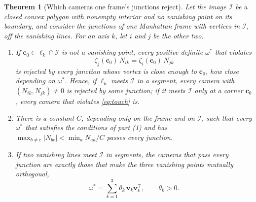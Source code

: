 \documentclass[pdflatex,sn-mathphys-num,iicol]{sn-jnl}
\newcommand{\vc}{\mathbf{c}}
\newcommand{\vv}{\mathbf{v}}
\theoremstyle{thmstyleone}
\newtheorem{theorem}{Theorem}
\theoremstyle{thmstylethree}
\theoremstyle{thmstyletwo}
\begin{document}
\begin{theorem}[Which cameras one frame's junctions reject]\label{thm:converse}
Let the image $\mathcal I$ be a closed convex polygon with nonempty interior and no vanishing point on its boundary, and consider the junctions of one Manhattan frame with vertices in $\mathcal I$, off the vanishing lines. For an axis $k$, let $i$ and $j$ be the other two.
\begin{enumerate}
\item If $\vc_0\in\ell_k\cap\mathcal I$ is not a vanishing point, every positive-definite $\omega^{*}$ that violates
\begin{equation}
\zeta_j(\vc_0)\,N_{ik}=\zeta_i(\vc_0)\,N_{jk}
\label{eq:touch}
\end{equation}
is rejected by every junction whose vertex is close enough to $\vc_0$, how close depending on $\omega^{*}$. Hence, if $\ell_k$ meets $\mathcal I$ in a segment, every camera with $(N_{ik},N_{jk})\neq0$ is rejected by some junction; if it meets $\mathcal I$ only at a corner $\vc_0$, every camera that violates \eqref{eq:touch} is.
\item There is a constant $C$, depending only on the frame and on $\mathcal I$, such that every $\omega^{*}$ that satisfies the conditions of part (1) and has $\max_{b\neq c}|N_{bc}|<\min_aN_{aa}/C$ passes every junction.
\item If two vanishing lines meet $\mathcal I$ in segments, the cameras that pass every junction are exactly those that make the three vanishing points mutually orthogonal,
\begin{equation}
\omega^{*}=\sum_{k=1}^{3}\theta_k\,\vv_k\vv_k^{\top},\qquad \theta_k>0 .
\label{eq:vpfamily}
\end{equation}
\end{enumerate}
\end{theorem}
\end{document}
